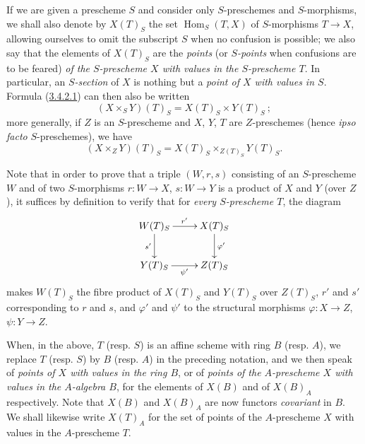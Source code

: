 \begin{env}[3.4.3]
\label{I.3.4.3}
If we are given a prescheme $S$ and consider only
$S$-preschemes and $S$-morphisms, we shall also denote by $X(T)_S$ the set
$\operatorname{Hom}_S(T,X)$ of $S$-morphisms $T\to X$, allowing ourselves to
omit the subscript $S$ when no confusion is possible; we also say
that the elements of $X(T)_S$ are the \emph{points} (or \emph{$S$-points}
when confusions are to be feared) \emph{of the $S$-prescheme $X$ with values
in the $S$-prescheme $T$}. In particular, an \emph{$S$-section} of $X$
is nothing but a \emph{point of $X$ with values in $S$}. Formula
(\hyperref[I.3.4.2.1]{3.4.2.1}) can then also be written
\[
  (X\times_S Y)(T)_S=X(T)_S\times Y(T)_S~;
  \tag{3.4.3.1}
\]
more generally, if $Z$ is an $S$-prescheme and $X$, $Y$, $T$ are
$Z$-preschemes (hence \emph{ipso facto} $S$-preschemes), we have
\[
  (X\times_Z Y)(T)_S=X(T)_S\times_{Z(T)_S}Y(T)_S.
  \tag{3.4.3.2}
\]

Note that in order to prove that a triple $(W,r,s)$ consisting of an
$S$-prescheme $W$ and of two $S$-morphisms $r:W\to X$, $s:W\to Y$ is a product
of $X$ and $Y$ (over $Z$), it suffices by definition to verify that for
\emph{every $S$-prescheme $T$}, the diagram
\label{I.3.4.3.product-diagram}
\[
  \xymatrix{
    W(T)_S\ar[r]^{r'}\ar[d]_{s'} & X(T)_S\ar[d]^{\varphi'}\\
    Y(T)_S\ar[r]_{\psi'} & Z(T)_S
  }
\]
makes $W(T)_S$ the fibre product of $X(T)_S$ and $Y(T)_S$ over
$Z(T)_S$, $r'$ and $s'$ corresponding to $r$ and $s$, and $\varphi'$ and
$\psi'$ to the structural morphisms $\varphi:X\to Z$, $\psi:Y\to Z$.
\end{env}

\begin{env}[3.4.4]
\label{I.3.4.4}
When, in the above, $T$ (resp. $S$) is an affine scheme with ring $B$
(resp. $A$), we replace $T$ (resp. $S$) by $B$ (resp. $A$) in the preceding
notation, and we then speak of \emph{points of $X$ with values in the ring
$B$}, or of \emph{points of the $A$-prescheme $X$ with values in the
$A$-algebra $B$}, for the elements of $X(B)$ and of $X(B)_A$ respectively.
Note that $X(B)$ and $X(B)_A$ are now functors \emph{covariant} in $B$. We
shall likewise write $X(T)_A$ for the set of points of the $A$-prescheme $X$
with values in the $A$-prescheme $T$.
\end{env}


